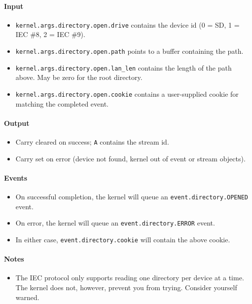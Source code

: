 \paragraph{Input}

\begin{itemize}
\item \verb+kernel.args.directory.open.drive+ contains the device id (0 = SD, 1 = IEC \#8, 2 = IEC \#9).
\item \verb+kernel.args.directory.open.path+ points to a buffer containing the path.
\item \verb+kernel.args.directory.open.lan_len+ contains the length of the path above.  May be zero for the root directory.
\item \verb+kernel.args.directory.open.cookie+ contains a user-supplied cookie for matching the completed event.
\end{itemize}

\paragraph{Output}

\begin{itemize}
\item Carry cleared on success; \verb+A+ contains the stream id.
\item Carry set on error (device not found, kernel out of event or stream objects).
\end{itemize}

\paragraph{Events}

\begin{itemize}
\item On successful completion, the kernel will queue an \verb+event.directory.OPENED+ event.
\item On error, the kernel will queue an \verb+event.directory.ERROR+ event.
\item In either case, \verb+event.directory.cookie+ will contain the above cookie.
\end{itemize}

\paragraph{Notes}

\begin{itemize}
\item The IEC protocol only supports reading one directory per device at a time.  The kernel does not, however, prevent you from trying.  Consider yourself warned.
\end{itemize}

